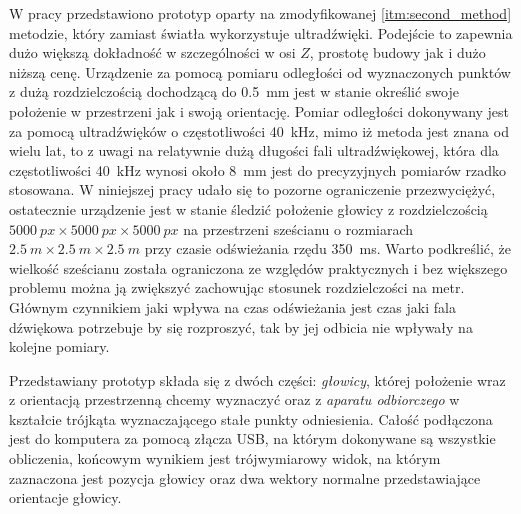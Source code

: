  W pracy przedstawiono prototyp oparty na zmodyfikowanej \ref{itm:second_method}
 metodzie, który zamiast światła wykorzystuje ultradźwięki. Podejście to zapewnia dużo większą
 dokładność w szczególności w osi $Z$, prostotę budowy jak i dużo niższą cenę.
 Urządzenie za pomocą pomiaru odległości od wyznaczonych punktów
z dużą rozdzielczością dochodzącą do \SI{0.5}{mm} jest w stanie określić swoje położenie
w przestrzeni jak i swoją orientację. 
Pomiar odległości dokonywany jest za pomocą ultradźwięków o częstotliwości \SI{40}{kHz},
mimo iż metoda jest znana od wielu lat, to z uwagi na relatywnie dużą długości fali ultradźwiękowej,
która dla częstotliwości \SI{40}{kHz} wynosi około \SI{8}{mm} jest do precyzyjnych pomiarów rzadko stosowana.
W niniejszej pracy udało się to pozorne ograniczenie przezwyciężyć,
ostatecznie urządzenie jest w stanie śledzić położenie głowicy z rozdzielczością 
$\SI{5000}{px} \times \SI{5000}{px} \times \SI{5000}{px}$ na przestrzeni sześcianu o rozmiarach 
$\SI{2.5}{m} \times \SI{2.5}{m}  \times \SI{2.5}{m} $ przy czasie odświeżania rzędu \SI{350}{ms}.
Warto podkreślić, że wielkość sześcianu została ograniczona ze względów praktycznych i bez 
większego problemu można ją zwiększyć zachowując stosunek rozdzielczości na metr.
Głównym czynnikiem jaki wpływa na czas odświeżania jest czas jaki fala dźwiękowa potrzebuje
by się rozproszyć, tak by jej odbicia nie wpływały na kolejne pomiary.

Przedstawiany prototyp składa się z dwóch części: \textit{głowicy}, której położenie wraz z orientacją przestrzenną chcemy wyznaczyć
oraz z \textit{aparatu odbiorczego} w kształcie trójkąta wyznaczającego stałe punkty odniesienia.
Całość  podłączona jest do komputera za pomocą złącza USB, na którym dokonywane są wszystkie obliczenia,
końcowym wynikiem jest trójwymiarowy widok, na którym zaznaczona jest pozycja głowicy oraz dwa wektory normalne
przedstawiające orientacje głowicy.




   